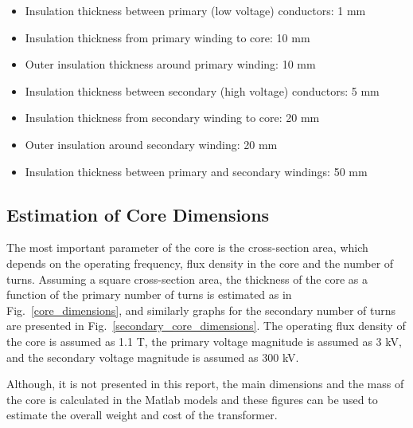 \documentclass[a4paper, 11pt]{article} %
\begin{document}
\begin{itemize}
\item Insulation thickness between primary (low voltage) conductors: 1 mm
\item Insulation thickness from primary winding to core: 10 mm
\item Outer insulation thickness around primary winding: 10 mm
\item Insulation thickness between secondary (high voltage) conductors: 5 mm
\item Insulation thickness from secondary winding to core: 20 mm
\item Outer insulation around secondary winding: 20 mm
\item Insulation thickness between primary and secondary windings: 50 mm
\end{itemize}

\subsection{Estimation of Core Dimensions}

The most important parameter of the core is the cross-section area, which depends on the operating frequency, flux density in the core and the number of turns. Assuming a square cross-section area, the thickness of the core as  a function of the primary number of turns is estimated as in Fig.~\ref{core_dimensions}, and similarly graphs for the secondary number of turns are presented in Fig.~\ref{secondary_core_dimensions}. The operating flux density of the core is assumed as 1.1 T, the primary voltage magnitude is assumed as 3 kV, and the secondary voltage magnitude is assumed as 300 kV.

Although, it is not presented in this report, the main dimensions and the mass of the core is calculated in the Matlab models and these figures can be used to estimate the overall weight and cost of the transformer.
\end{document}
